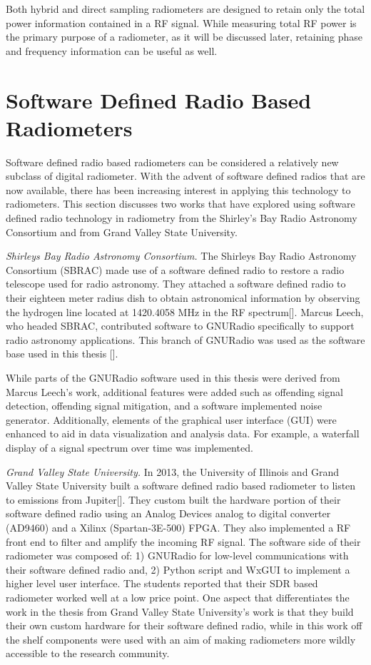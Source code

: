 Both hybrid and direct sampling radiometers are designed to retain only the total power information contained in a RF signal.  While measuring total RF power is the primary purpose of a radiometer, as it will be discussed later, retaining phase and frequency information can be useful as well.

\section{Software Defined Radio Based Radiometers}

Software defined radio based radiometers can be considered a relatively new subclass of digital radiometer.  With the advent of software defined radios that are now available, there has been increasing interest in applying this technology to radiometers.  This section discusses two works that have explored using software defined radio technology in radiometry from the Shirley's Bay Radio Astronomy Consortium and from Grand Valley State University.

\emph{Shirleys Bay Radio Astronomy Consortium.}  The Shirleys Bay Radio Astronomy Consortium (SBRAC) made use of a software defined radio to restore a radio telescope used for radio astronomy.  They attached a software defined radio to their eighteen meter radius dish to obtain astronomical information by observing the hydrogen line located at 1420.4058 MHz in the RF spectrum[\cite{Leech2007}].  Marcus Leech, who headed SBRAC, contributed software to GNURadio specifically to support radio astronomy applications.  This branch of GNURadio was used as the software base used in this thesis [\cite{Leech}].

While parts of the GNURadio software used in this thesis were derived from Marcus Leech's work, additional features were added such as offending signal detection, offending signal mitigation, and a software implemented noise generator.  Additionally, elements of the graphical user interface (GUI) were enhanced to aid in data visualization and analysis data.  For example, a waterfall display of a signal spectrum over time was implemented.

\emph{Grand Valley State University.}  In 2013, the University of Illinois and Grand Valley State University built a software defined radio based radiometer to listen to emissions from Jupiter[\cite{Behnke}].  They custom built the hardware portion of their software defined radio using an Analog Devices analog to digital converter (AD9460) and a Xilinx (Spartan-3E-500) FPGA.  They also implemented a RF front end to filter and amplify the incoming RF signal.  The software side of their radiometer was composed of: 1) GNURadio for low-level communications with their software defined radio and, 2) Python script and WxGUI to implement a higher level user interface.  The students reported that their SDR based radiometer worked well at a low price point.  One aspect that differentiates the work in the thesis from Grand Valley State University's work is that they build their own custom hardware for their software defined radio, while in this work off the shelf components were used with an aim of making radiometers more wildly accessible to the research community.

